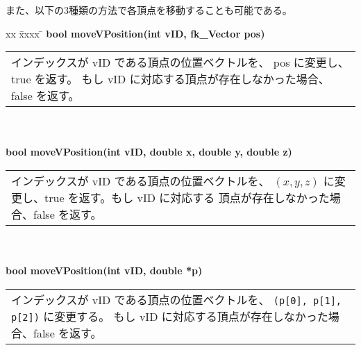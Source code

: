 また、以下の3種類の方法で各頂点を移動することも可能である。
\begin{tabbing}
xx \= xxxx \= \kill
\> \textbf{bool moveVPosition(int vID, fk\_Vector pos)} \\
	\> \> \begin{tabular}{p{15cm}}
		インデックスが vID である頂点の位置ベクトルを、
		pos に変更し、true を返す。
		もし vID に対応する頂点が存在しなかった場合、false を返す。
	\end{tabular} \\ \\

\> \textbf{bool moveVPosition(int vID, double x, double y, double z)} \\
	\> \> \begin{tabular}{p{15cm}}
		インデックスが vID である頂点の位置ベクトルを、
		\((x, y, z)\) に変更し、true を返す。もし vID に対応する
		頂点が存在しなかった場合、false を返す。
	\end{tabular} \\ \\

\> \textbf{bool moveVPosition(int vID, double *p)} \\
	\> \> \begin{tabular}{p{15cm}}
		インデックスが vID である頂点の位置ベクトルを、
		\verb+(p[0], p[1], p[2])+ に変更する。
		もし vID に対応する頂点が存在しなかった場合、false を返す。
	\end{tabular}
\end{tabbing}


